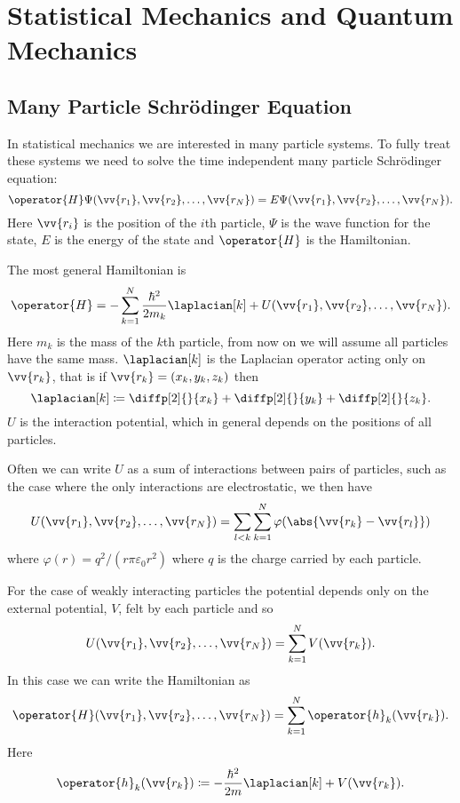 \documentclass[fleqn]{NotesClass}
\begin{document}
    \chapter{Statistical Mechanics and Quantum Mechanics}
    \section{Many Particle Schrödinger Equation}
    In statistical mechanics we are interested in many particle systems.
    To fully treat these systems we need to solve the time independent many particle Schrödinger equation:
    \begin{equation}
        \operator{H}\Psi(\vv{r_1}, \vv{r_2}, \dotsc, \vv{r_N}) = E\Psi(\vv{r_1}, \vv{r_2}, \dotsc, \vv{r_N}).
    \end{equation}
    Here \(\vv{r_i}\) is the position of the \(i\)th particle, \(\Psi\) is the wave function for the state, \(E\) is the energy of the state and \(\operator{H}\) is the Hamiltonian.
    
    The most general Hamiltonian is
    \begin{equation}
        \operator{H} = -\sum_{k=1}^{N} \frac{\hbar^2}{2m_k}\laplacian[k] + U(\vv{r_1}, \vv{r_2}, \dotsc, \vv{r_N}).
    \end{equation}
    Here \(m_k\) is the mass of the \(k\)th particle, from now on we will assume all particles have the same mass.
    \(\laplacian[k]\) is the Laplacian operator acting only on \(\vv{r_k}\), that is if \(\vv{r_k} = (x_k, y_k, z_k)\) then
    \begin{equation}
        \laplacian[k] \coloneqq \diffp[2]{}{x_k} + \diffp[2]{}{{y_k}} + \diffp[2]{}{z_k}.
    \end{equation}
    \(U\) is the interaction potential, which in general depends on the positions of all particles.
    
    Often we can write \(U\) as a sum of interactions between pairs of particles, such as the case where the only interactions are electrostatic, we then have
    \begin{equation}
        U(\vv{r_1}, \vv{r_2}, \dotsc, \vv{r_N}) = \sum_{l < k}\sum_{k = 1}^{N} \varphi(\abs{\vv{r_k} - \vv{r_l}})
    \end{equation}
    where \(\varphi(r) = q^2/(r\pi\varepsilon_0 r^2)\) where \(q\) is the charge carried by each particle.
    
    For the case of weakly interacting particles the potential depends only on the external potential, \(V\), felt by each particle and so
    \begin{equation}
        U(\vv{r_1}, \vv{r_2}, \dotsc, \vv{r_N}) = \sum_{k = 1}^{N} V(\vv{r_k}).
    \end{equation}
    In this case we can write the Hamiltonian as
    \begin{equation}
        \operator{H}(\vv{r_1}, \vv{r_2}, \dotsc, \vv{r_N}) = \sum_{k = 1}^{N} \operator{h}_k(\vv{r_k}).
    \end{equation}
    Here
    \begin{equation}
        \operator{h}_k(\vv{r_k}) \coloneqq -\frac{\hbar^2}{2m} \laplacian[k] + V(\vv{r_k}).
    \end{equation}
    
\end{document}

